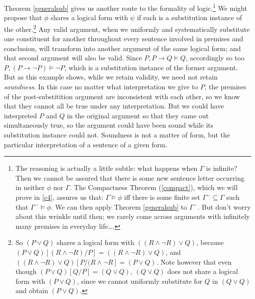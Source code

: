 Theorem \ref{generalsub} gives us another route to the formality of logic.\footnote{The reasoning is actually a little subtle: what happens when $\Gamma$ is infinite? Then we cannot be assured that there is some new sentence letter occurring in neither $\phi$ nor $\Gamma$. The Compactness Theorem (\autoref{compact}), which we will prove in \autoref{c4}, assures us that: $\Gamma \vDash \phi$ iff there is some finite set $\Gamma^{-} \subseteq \Gamma$ such that $\Gamma^{-} \vDash \phi$. We can then apply Theorem \ref{generalsub} to $\Gamma^{-}$. But don't worry about this wrinkle until then; we rarely come across arguments with infinitely many premises in everyday life….} We might propose that $\phi$ shares a logical form with $\psi$ if each is a substitution instance of the other.\footnote{So $(P\vee Q)$ shares a logical form with $((R\wedge ¬R) \vee Q)$, because $(P\vee Q)[(R \wedge \neg R)/P] = ((R\wedge ¬R) \vee Q)$, and $((R\wedge ¬R) \vee Q)[P/(R \wedge ¬R] = (P\vee Q)$. Note however that even though $(P\vee Q)[Q/P] = (Q \vee Q)$, $(Q \vee Q)$ does not share a logical form with $(P \vee Q)$, since we cannot uniformly substitute for $Q$ in $(Q\vee Q)$ and obtain $(P\vee Q)$.} Any valid argument, when we uniformly and systematically substitute one constituent for another throughout every sentence involved in premises and conclusion, will transform into another argument of the same logical form; and that second argument will also be valid. Since $P, P\to Q \vDash Q$, accordingly so too $P, (P \to \neg P) \vDash \neg P$, which is a substitution instance of the former argument. But as this example shows, while we retain validity, we need not retain \emph{soundness}. In this case no matter what interpretation we give to $P$, the premises of the post-substitition argument are inconsistent with each other, so we know that they cannot all be true under any interpretation. But we could have interpreted $P$ and $Q$ in the original argument so that they came out simultaneously true, so the argument could have been sound while its substitution instance could not. Soundness is not a matter of form, but the particular interpretation of a sentence of a given form. 

